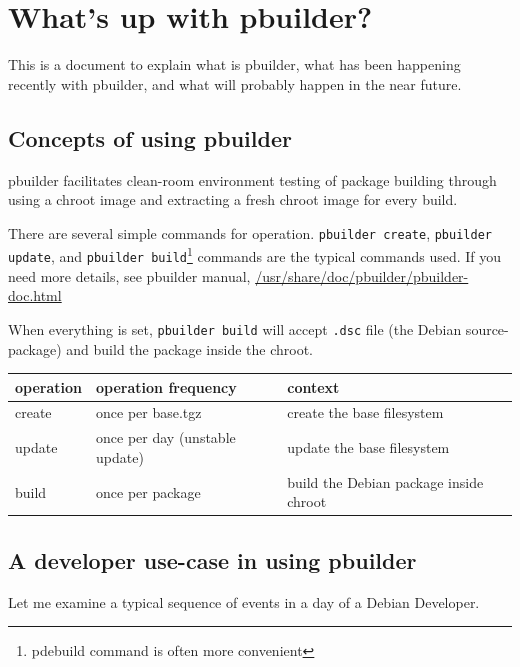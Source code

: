 \documentclass[a4paper]{article}
\begin{document}
\section{What's up with pbuilder?}

This is a document to explain what is pbuilder, what has been happening
recently with pbuilder, and what will probably happen in the near
future.

\subsection{Concepts of using pbuilder}

pbuilder facilitates clean-room environment testing of package building
through using a chroot image and extracting a fresh chroot image for
every build.

There are several simple commands for operation. \texttt{pbuilder
create}, \texttt{pbuilder update}, and \texttt{pbuilder
build}\footnote{pdebuild command is often more convenient} commands are
the typical commands used. If you need more details, see pbuilder
manual, \url{/usr/share/doc/pbuilder/pbuilder-doc.html}

When everything is set, \texttt{pbuilder build} will accept 
\texttt{.dsc} file (the Debian source-package) and build the package
inside the chroot.

\begin{tabular}{|l|l|l|}
\hline
operation & operation frequency & context \\
\hline
create & once per base.tgz & create the base filesystem \\
update & once per day (unstable update) & update the base filesystem \\
build & once per package & build the Debian package inside chroot \\
\hline
\end{tabular}

\newpage{}
\subsection{A developer use-case in using pbuilder}

Let me examine a typical sequence of events in a day of a Debian Developer.

\end{document}
